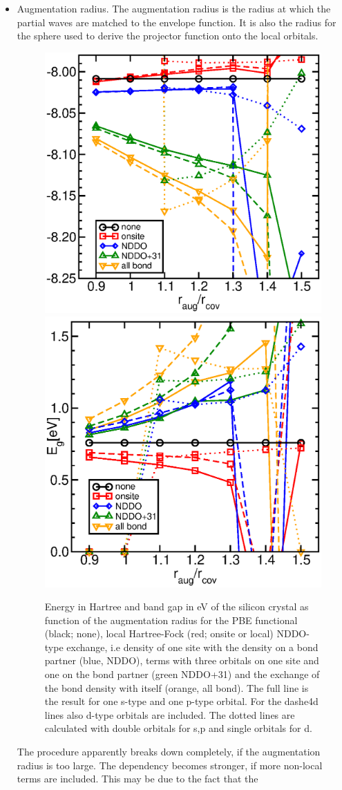 \documentclass[11pt,a4paper]{report}
\begin{document}
\begin{itemize}
\item Augmentation radius. The augmentation radius is the radius at
  which the partial waves are matched to the envelope function. It is
  also the radius for the sphere used to derive the projector function
  onto the local orbitals.
\begin{figure}[h!]
\begin{center}
\includegraphics[width=0.5\linewidth,clip=true]{Figs/Eofraugsi/eofraug.eps}
\includegraphics[width=0.4\linewidth,clip=true]{Figs/Gapofraugsi/gapofraug.eps}\hfill
\end{center}
\caption{Energy in Hartree and band gap in eV of the silicon crystal
  as function of the augmentation radius for the PBE functional
  (black; none), local Hartree-Fock (red; onsite or local) NDDO-type
  exchange, i.e density of one site with the density on a bond partner
  (blue, NDDO), terms with three orbitals on one site and one on the
  bond partner (green NDDO+31) and the exchange of the bond density
  with itself (orange, all bond).  The full line is the result for one
  s-type and one p-type orbital. For the dashe4d lines also d-type
  orbitals are included. The dotted lines are calculated with double
  orbitals for s,p and single orbitals for d.}
\end{figure}
The procedure apparently breaks down completely, if the augmentation
radius is too large. The dependency becomes stronger, if more
non-local terms are included. This may be due to the fact that the

\end{itemize}
\end{document}
